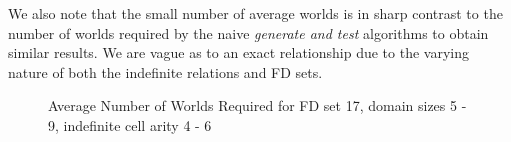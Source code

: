 We also note that the small number of average worlds is in sharp
contrast to the number of worlds required by the naive {\em generate and
test} algorithms to obtain similar results. We are vague as to an
exact relationship due to the varying nature of both the indefinite
relations and FD sets.

\begin{figure}
\begin{minipage}{7cm}
\centerline{}
\caption{\label{graph:4.4w} {Average Number of Worlds
Required for FD set 17, domain sizes 3 - 9, max indefinite arity 2}}
\end{minipage}
\hfill
\begin{minipage}{7cm}
\centerline{}
\caption{\label{graph:4.5w} {Average Number of Worlds Required for FD
set 17, domain sizes 5 - 9, indefinite cell arity 4 - 6}}
\end{minipage}
\end{figure}




